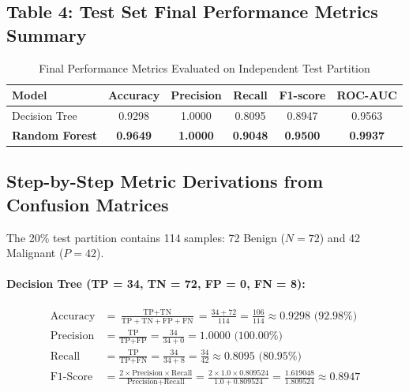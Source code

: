 \documentclass[12pt,a4paper]{article}
\begin{document}
\subsection*{Table 4: Test Set Final Performance Metrics Summary}

\begin{table}[H]
\centering
\begin{tabular}{lccccc}
\toprule
\textbf{Model} & \textbf{Accuracy} & \textbf{Precision} & \textbf{Recall} & \textbf{F1-score} & \textbf{ROC-AUC} \\
\midrule
Decision Tree & 0.9298 & 1.0000 & 0.8095 & 0.8947 & 0.9563 \\
\textbf{Random Forest} & \textbf{0.9649} & \textbf{1.0000} & \textbf{0.9048} & \textbf{0.9500} & \textbf{0.9937} \\
\bottomrule
\end{tabular}
\caption{Final Performance Metrics Evaluated on Independent Test Partition}
\label{tab:exp5_final_metrics}
\end{table}

\subsection*{Step-by-Step Metric Derivations from Confusion Matrices}

The 20\% test partition contains 114 samples: 72 Benign ($N = 72$) and 42 Malignant ($P = 42$).

\paragraph{Decision Tree (TP = 34, TN = 72, FP = 0, FN = 8):}
\begin{align}
\text{Accuracy} &= \frac{\text{TP} + \text{TN}}{\text{TP} + \text{TN} + \text{FP} + \text{FN}} = \frac{34 + 72}{114} = \frac{106}{114} \approx 0.9298 \text{ (92.98\%)} \\
\text{Precision} &= \frac{\text{TP}}{\text{TP} + \text{FP}} = \frac{34}{34 + 0} = 1.0000 \text{ (100.00\%)} \\
\text{Recall} &= \frac{\text{TP}}{\text{TP} + \text{FN}} = \frac{34}{34 + 8} = \frac{34}{42} \approx 0.8095 \text{ (80.95\%)} \\
\text{F1-Score} &= \frac{2 \times \text{Precision} \times \text{Recall}}{\text{Precision} + \text{Recall}} = \frac{2 \times 1.0 \times 0.809524}{1.0 + 0.809524} = \frac{1.619048}{1.809524} \approx 0.8947
\end{align}
\end{document}
